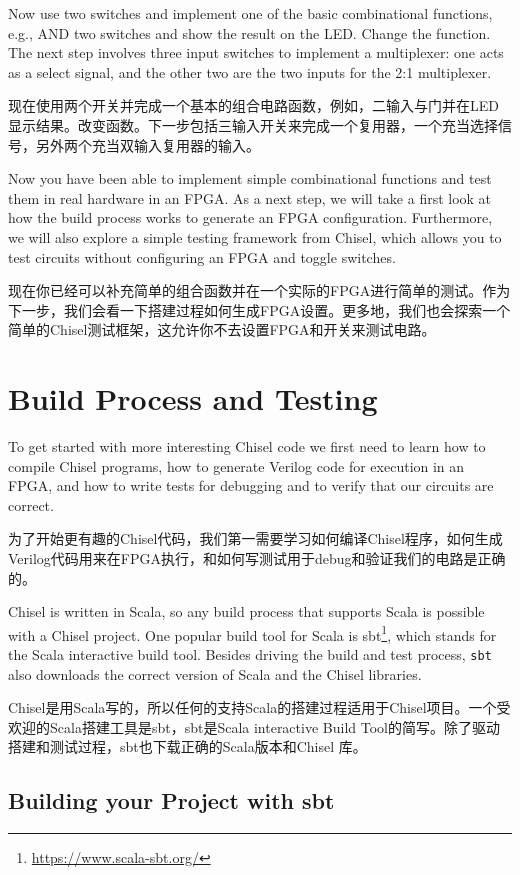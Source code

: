 \documentclass[%
    10pt,
    headinclude, footexclude,
    openright, %
    notitlepage,
    cleardoubleempty,
    headsepline,
    pointlessnumbers,
    bibtotoc, idxtotoc,
    ]{scrbook}
\newcommand{\code}[1]{{\small{\texttt{#1}}}}
\newcommand{\myref}[2]{\href{#1}{#2}}
\renewcommand{\myref}[2]{{#2}{\footnote{\url{#1}}}}
\begin{document}
Now use two switches and implement one of the basic combinational functions,
e.g., AND two switches and show the result on the LED. Change the function.
The next step involves three input switches to implement a multiplexer: one acts as
a select signal, and the other two are the two inputs for the 2:1 multiplexer.

现在使用两个开关并完成一个基本的组合电路函数，例如，二输入与门并在LED显示结果。改变函数。下一步包括三输入开关来完成一个复用器，一个充当选择信号，另外两个充当双输入复用器的输入。


Now you have been able to implement simple combinational functions and test them
in real hardware in an FPGA. As a next step, we will take a first look at how the build
process works to generate an FPGA configuration. Furthermore, we will also
explore a simple testing framework from Chisel, which allows you to test circuits
without configuring an FPGA and toggle switches.

现在你已经可以补充简单的组合函数并在一个实际的FPGA进行简单的测试。作为下一步，我们会看一下搭建过程如何生成FPGA设置。更多地，我们也会探索一个简单的Chisel测试框架，这允许你不去设置FPGA和开关来测试电路。


\chapter{Build Process and Testing}

To get started with more interesting Chisel code we first need to learn how to compile
Chisel programs, how to generate Verilog code for execution in an FPGA, and how
to write tests for debugging and to verify that our circuits are correct.

为了开始更有趣的Chisel代码，我们第一需要学习如何编译Chisel程序，如何生成Verilog代码用来在FPGA执行，和如何写测试用于debug和验证我们的电路是正确的。


Chisel is written in Scala, so any build process that supports Scala is possible
with a Chisel project. One popular build tool for Scala is \myref{https://www.scala-sbt.org/}{sbt},
which stands for the Scala interactive build tool.
Besides driving the build and test process, \code{sbt} also downloads the correct
version of Scala and the Chisel libraries.

Chisel是用Scala写的，所以任何的支持Scala的搭建过程适用于Chisel项目。一个受欢迎的Scala搭建工具是sbt，sbt是Scala interactive Build Tool的简写。除了驱动搭建和测试过程，sbt也下载正确的Scala版本和Chisel 库。


\section{Building your Project with sbt}
\end{document}
